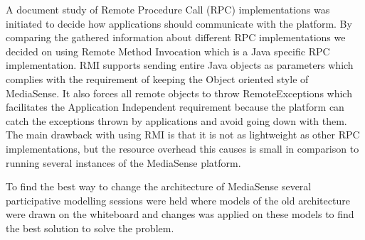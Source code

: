 A document study of Remote Procedure Call (RPC) implementations was initiated to decide how applications should communicate with the platform. By comparing the gathered information about different RPC implementations we decided on using Remote Method Invocation which is a Java specific RPC implementation. RMI supports sending entire Java objects as parameters which complies with the requirement of keeping the Object oriented style of MediaSense. It also forces all remote objects to throw RemoteExceptions which facilitates the Application Independent requirement because the platform can catch the exceptions thrown by applications and avoid going down with them. The main drawback with using RMI is that it is not as lightweight as other RPC implementations, but the resource overhead this causes is small in comparison to running several instances of the MediaSense platform.

To find the best way to change the architecture of MediaSense several participative modelling sessions were held where models of the old architecture were drawn on the whiteboard and changes was applied on these models to find the best solution to solve the problem.
